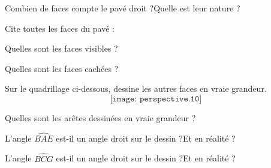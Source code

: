 \begin{myenumerate}
\item Combien de faces compte le pavé droit ?\dotfill Quelle est leur
nature ?\dotfill
\item Cite toutes les faces du pavé :\dotfill\par
\dotfill
\item Quelles sont les faces \og{}visibles\fg{} ?\dotfill
\item Quelles sont les faces \og{}cachées\fg{} ?\dotfill
\item Sur le quadrillage ci-dessous, dessine les autres faces en vraie
grandeur.
\[\texttt{[image: perspective.10]}\]
\item Quelles sont les arêtes dessinées en vraie grandeur ?\dotfill
\item L'angle $\widehat{BAE}$ est-il un angle droit sur le dessin
?\dotfill Et en réalité ?\dotfill
\item L'angle $\widehat{BCG}$ est-il un angle droit sur le dessin
?\dotfill Et en réalité ?\dotfill
\end{myenumerate}
